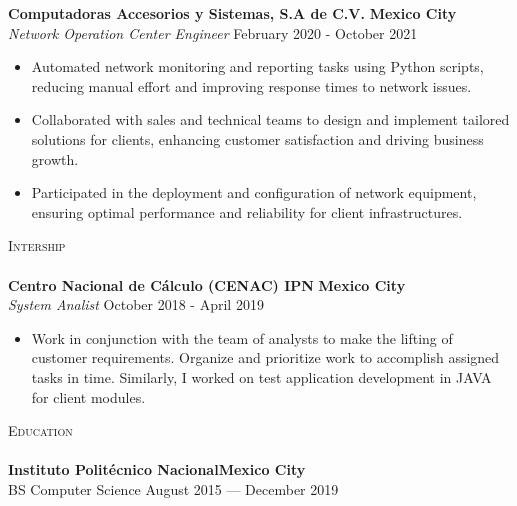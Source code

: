 \documentclass[a4paper]{article}
\newcommand{\lineunder} {
    \vspace*{-8pt} \\
    \hspace*{-18pt} \hrulefill \\
}
\newcommand{\header} [1] {
    {\hspace*{-18pt}\vspace*{6pt} \textsc{#1}}
    \vspace*{-6pt} \lineunder
}
\begin{document}
\textbf{Computadoras Accesorios y Sistemas, S.A de C.V.} \hfill \textbf{Mexico City}\\
\textit{Network Operation Center Engineer} \hfill February 2020 - October 2021\\
\vspace{-1mm}
\begin{itemize} \itemsep 1pt
    \item Automated network monitoring and reporting tasks using Python scripts, reducing manual effort and improving response times to network issues.
    \item Collaborated with sales and technical teams to design and implement tailored solutions for clients, enhancing customer satisfaction and driving business growth.
    \item Participated in the deployment and configuration of network equipment, ensuring optimal performance and reliability for client infrastructures.
\end{itemize}
\vspace{2mm}

\header{Intership}
\textbf{Centro Nacional de Cálculo 
(CENAC) IPN} \hfill \textbf{Mexico City}\\
\textit{System Analist} \hfill October 2018 - April 2019\\
\vspace{-1mm}
\begin{itemize} \itemsep 1pt
    \item  Work in conjunction with the team of analysts to make the lifting of customer requirements. Organize and prioritize work to accomplish assigned tasks in time. Similarly, I worked on test application development in JAVA for client modules.
\end{itemize}

\header{Education}
\textbf{Instituto Politécnico Nacional}\hfill \textbf{Mexico City} \\
BS Computer Science \hfill August 2015 — December 2019\\ 
\vspace{2mm}
\end{document}
